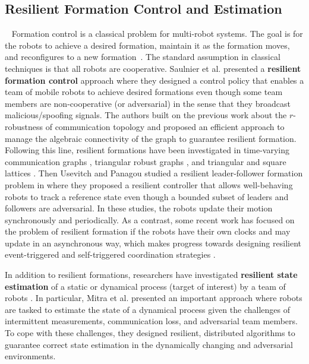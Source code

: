 \subsection{Resilient Formation Control and Estimation}~\label{subsec:resi_control}
Formation control is a classical problem for multi-robot systems. The goal is for the robots to achieve a desired formation, maintain it as the formation moves, and reconfigures to a new formation~\cite{oh2015survey}. The standard assumption in classical techniques is that all robots are cooperative. Saulnier et al. presented a \textbf{resilient formation control} approach \cite{saulnier2017resilient} where they designed a control policy that enables a team of mobile robots to achieve desired formations even though some team members are non-cooperative (or adversarial) in the sense that they broadcast malicious/spoofing signals. The authors built on the previous work about the $r$-robustness of communication topology \cite{leblanc2013resilient} and proposed an efficient approach to manage the algebraic connectivity of the graph to guarantee resilient formation. Following this line, resilient formations have been investigated in time-varying communication graphs \cite{saldana2017resilient}, triangular robust graphs \cite{saldana2018triangular}, and triangular and square lattices \cite{guerrero2018design,saldana2019resilient}. Then Usevitch and Panagou studied a resilient leader-follower formation problem in \cite{usevitch2019resilient} where they proposed a resilient controller that allows well-behaving robots to track a reference state even though a bounded subset of leaders and followers are adversarial. In these  studies, the robots update their motion synchronously and periodically. As a contrast, some recent work has focused on the problem of resilient formation if the robots have their
own clocks and may update in an asynchronous way, which makes progress towards designing resilient event-triggered
and self-triggered coordination strategies \cite{senejohnny2018resilience,senejohnny2019resilience}. 

In addition to resilient formations,  researchers have investigated \textbf{resilient state estimation} of a static or dynamical process (target of interest) by a team of robots \cite{mitra2019resilient,mitra2016secure,mitra2018impact,mitra2019byzantine}. In particular, Mitra et al. presented an important approach \cite{mitra2019resilient} where robots are tasked to estimate the state of a dynamical process given the challenges of intermittent measurements, communication loss, and adversarial team members. To cope with these challenges, they designed resilient, distributed algorithms to guarantee correct state estimation in the dynamically changing and adversarial environments. 

